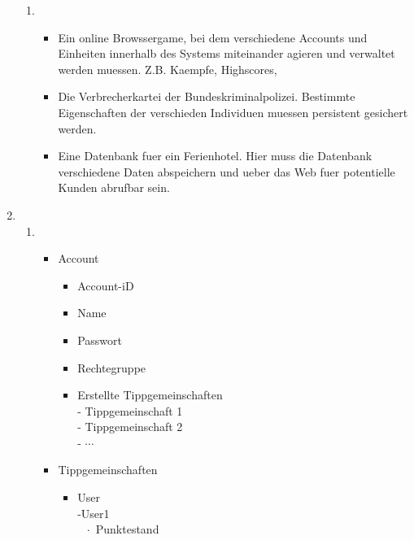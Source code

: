 \documentclass{article}
\begin{document}
\begin{enumerate}
\begin{enumerate}
                \item \begin{itemize}
                            \item Ein online Browssergame, bei dem verschiedene Accounts und Einheiten innerhalb des Systems miteinander agieren und verwaltet werden muessen. Z.B. Kaempfe, Highscores, 
                            \item Die Verbrecherkartei der Bundeskriminalpolizei. Bestimmte Eigenschaften der verschieden Individuen muessen persistent gesichert werden.
                            \item Eine Datenbank fuer ein Ferienhotel. Hier muss die Datenbank verschiedene Daten abspeichern und ueber das Web fuer potentielle Kunden abrufbar sein.
                       \end{itemize}
            \end{enumerate} 
        \item   
            \begin{enumerate}
               \item
                   \begin{itemize}
                       \item Account
                            \begin{itemize}
                                \item Account-iD
                                \item Name
                                \item Passwort
                                \item Rechtegruppe
                                \item Erstellte Tippgemeinschaften\\
                                    - Tippgemeinschaft 1\\
                                    - Tippgemeinschaft 2\\
                                    - $\cdots$
                            \end{itemize}
                        \item Tippgemeinschaften
                            \begin{itemize}
                                \item User\\
                                    -User1\\
                                        $\text{      }\cdot$ Punktestand

\end{itemize}
\end{itemize}
\end{enumerate}
\end{enumerate}
\end{document}
